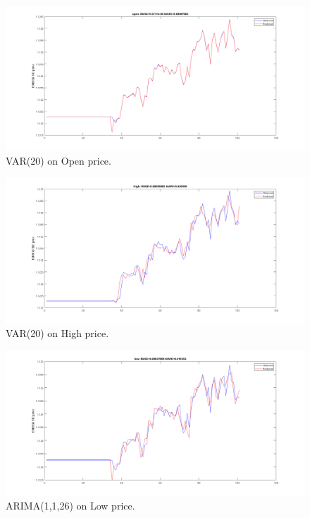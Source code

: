 \documentclass[11pt]{article}
\begin{document}
\begin{figure}[H]
  \centering
  \includegraphics[width=\textwidth,keepaspectratio]{figs/var20open100.png}
  \caption{VAR(20) on Open price.}
\end{figure}

\begin{figure}[H]
  \centering
  \includegraphics[width=\linewidth,keepaspectratio]{figs/var20high100.png}
  \caption{VAR(20) on High price.}
\end{figure}

\begin{figure}[H]
  \centering
  \includegraphics[width=\linewidth,keepaspectratio]{figs/var20low100.png}
  \caption{ARIMA(1,1,26) on Low price.}
\end{figure}
\end{document}
